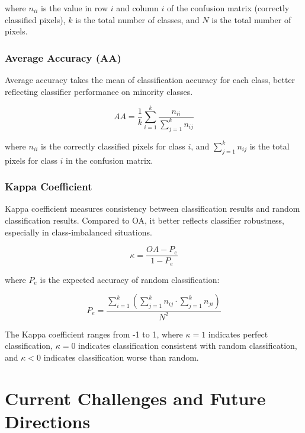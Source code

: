 \documentclass[journal]{IEEEtran}
\begin{document}
where $n_{ii}$ is the value in row $i$ and column $i$ of the confusion matrix (correctly classified pixels), $k$ is the total number of classes, and $N$ is the total number of pixels.

\subsubsection{Average Accuracy (AA)}

Average accuracy takes the mean of classification accuracy for each class, better reflecting classifier performance on minority classes.

\begin{equation}
AA = \frac{1}{k}\sum_{i=1}^k \frac{n_{ii}}{\sum_{j=1}^k n_{ij}}
\end{equation}

where $n_{ii}$ is the correctly classified pixels for class $i$, and $\sum_{j=1}^k n_{ij}$ is the total pixels for class $i$ in the confusion matrix.

\subsubsection{Kappa Coefficient}

Kappa coefficient measures consistency between classification results and random classification results. Compared to OA, it better reflects classifier robustness, especially in class-imbalanced situations.

\begin{equation}
\kappa = \frac{OA - P_e}{1 - P_e}
\end{equation}

where $P_e$ is the expected accuracy of random classification:

\begin{equation}
P_e = \frac{\sum_{i=1}^k (\sum_{j=1}^k n_{ij} \cdot \sum_{j=1}^k n_{ji})}{N^2}
\end{equation}

The Kappa coefficient ranges from -1 to 1, where $\kappa = 1$ indicates perfect classification, $\kappa = 0$ indicates classification consistent with random classification, and $\kappa < 0$ indicates classification worse than random.



\section{Current Challenges and Future Directions}
\end{document}

